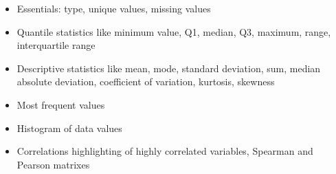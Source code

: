 \begin{itemize}
   \item Essentials: type, unique values, missing values
   \item Quantile statistics like minimum value, Q1, median, Q3, maximum, range, interquartile range
   \item Descriptive statistics like mean, mode, standard deviation, sum, median absolute deviation, coefficient of variation, kurtosis, skewness
   \item Most frequent values
   \item Histogram of data values
   \item Correlations highlighting of highly correlated variables, Spearman and Pearson matrixes
\end{itemize}


